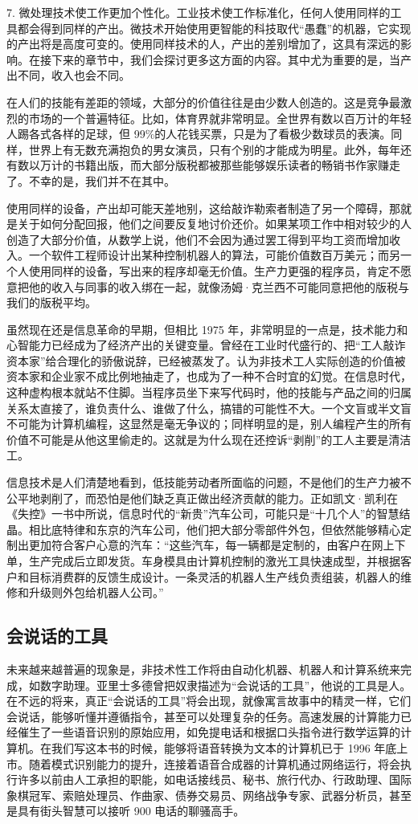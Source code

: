 7. 微处理技术使工作更加个性化。工业技术使工作标准化，任何人使用同样的工具都会得到同样的产出。微技术开始使用更智能的科技取代“愚蠢”的机器，它实现的产出将是高度可变的。使用同样技术的人，产出的差别增加了，这具有深远的影响。在接下来的章节中，我们会探讨更多这方面的内容。其中尤为重要的是，当产出不同，收入也会不同。

在人们的技能有差距的领域，大部分的价值往往是由少数人创造的。这是竞争最激烈的市场的一个普遍特征。比如，体育界就非常明显。全世界有数以百万计的年轻人踢各式各样的足球，但 99\%的人花钱买票，只是为了看极少数球员的表演。同样，世界上有无数充满抱负的男女演员，只有个别的才能成为明星。此外，每年还有数以万计的书籍出版，而大部分版税都被那些能够娱乐读者的畅销书作家赚走了。不幸的是，我们并不在其中。

使用同样的设备，产出却可能天差地别，这给敲诈勒索者制造了另一个障碍，那就是关于如何分配回报，他们之间要反复地讨价还价。如果某项工作中相对较少的人创造了大部分价值，从数学上说，他们不会因为通过罢工得到平均工资而增加收入。一个软件工程师设计出某种控制机器人的算法，可能价值数百万美元；而另一个人使用同样的设备，写出来的程序却毫无价值。生产力更强的程序员，肯定不愿意把他的收入与同事的收入绑在一起，就像汤姆·克兰西不可能同意把他的版税与我们的版税平均。

虽然现在还是信息革命的早期，但相比 1975 年，非常明显的一点是，技术能力和心智能力已经成为了经济产出的关键变量。曾经在工业时代盛行的、把“工人敲诈资本家”给合理化的骄傲说辞，已经被蒸发了。认为非技术工人实际创造的价值被资本家和企业家不成比例地抽走了，也成为了一种不合时宜的幻觉。在信息时代，这种虚构根本就站不住脚。当程序员坐下来写代码时，他的技能与产品之间的归属关系太直接了，谁负责什么、谁做了什么，搞错的可能性不大。一个文盲或半文盲不可能为计算机编程，这显然是毫无争议的；同样明显的是，别人编程产生的所有价值不可能是从他这里偷走的。这就是为什么现在还控诉“剥削”的工人主要是清洁工。

信息技术是人们清楚地看到，低技能劳动者所面临的问题，不是他们的生产力被不公平地剥削了，而恐怕是他们缺乏真正做出经济贡献的能力。正如凯文·凯利在《失控》一书中所说，信息时代的“新贵”汽车公司，可能只是“十几个人”的智慧结晶。相比底特律和东京的汽车公司，他们把大部分零部件外包，但依然能够精心定制出更加符合客户心意的汽车：“这些汽车，每一辆都是定制的，由客户在网上下单，生产完成后立即发货。车身模具由计算机控制的激光工具快速成型，并根据客户和目标消费群的反馈生成设计。一条灵活的机器人生产线负责组装，机器人的维修和升级则外包给机器人公司。”

\subsection{会说话的工具}
未来越来越普遍的现象是，非技术性工作将由自动化机器、机器人和计算系统来完成，如数字助理。亚里士多德曾把奴隶描述为“会说话的工具”，他说的工具是人。在不远的将来，真正“会说话的工具”将会出现，就像寓言故事中的精灵一样，它们会说话，能够听懂并遵循指令，甚至可以处理复杂的任务。高速发展的计算能力已经催生了一些语音识别的原始应用，如免提电话和根据口头指令进行数学运算的计算机。在我们写这本书的时候，能够将语音转换为文本的计算机已于 1996 年底上市。随着模式识别能力的提升，连接着语音合成器的计算机通过网络运行，将会执行许多以前由人工承担的职能，如电话接线员、秘书、旅行代办、行政助理、国际象棋冠军、索赔处理员、作曲家、债券交易员、网络战争专家、武器分析员，甚至是具有街头智慧可以接听 900 电话的聊骚高手。

